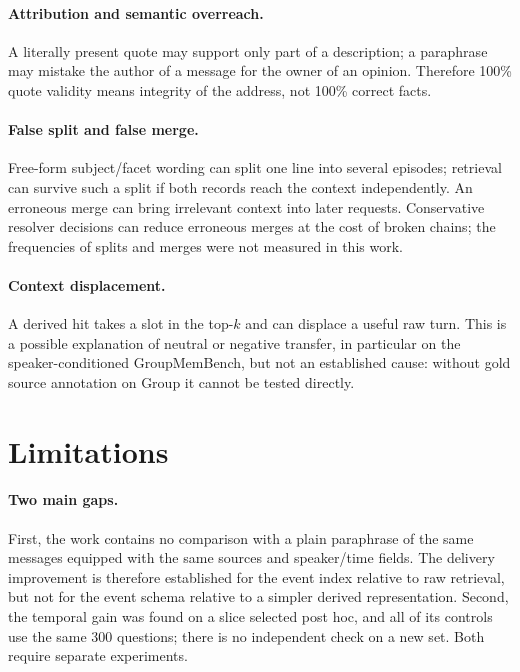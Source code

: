 \documentclass[11pt,a4paper]{article}
\begin{document}
\paragraph{Attribution and semantic overreach.}
A literally present quote may support only part of a description; a paraphrase may
mistake the author of a message for the owner of an opinion. Therefore 100\% quote
validity means integrity of the address, not 100\% correct facts.

\paragraph{False split and false merge.}
Free-form subject/facet wording can split one line into several episodes; retrieval
can survive such a split if both records reach the context independently. An
erroneous merge can bring irrelevant context into later requests. Conservative
resolver decisions can reduce erroneous merges at the cost of broken chains; the
frequencies of splits and merges were not measured in this work.

\paragraph{Context displacement.}
A derived hit takes a slot in the top-$k$ and can displace a useful raw turn. This is
a possible explanation of neutral or negative transfer, in particular on the
speaker-conditioned GroupMemBench, but not an established cause: without gold source
annotation on Group it cannot be tested directly.

\section{Limitations}
\label{sec:limits}

\paragraph{Two main gaps.}
First, the work contains no comparison with a plain paraphrase of the same messages
equipped with the same sources and speaker/time fields. The delivery improvement is
therefore established for the event index relative to raw retrieval, but not for the
event schema relative to a simpler derived representation. Second, the temporal gain
was found on a slice selected post hoc, and all of its controls use the same 300
questions; there is no independent check on a new set. Both require separate
experiments.
\end{document}
